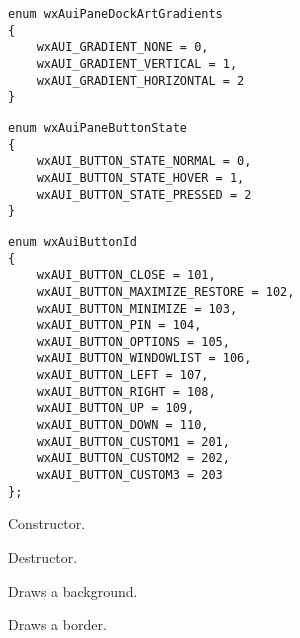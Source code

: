\begin{verbatim}
enum wxAuiPaneDockArtGradients
{
    wxAUI_GRADIENT_NONE = 0,
    wxAUI_GRADIENT_VERTICAL = 1,
    wxAUI_GRADIENT_HORIZONTAL = 2
}
\end{verbatim}

\begin{verbatim}
enum wxAuiPaneButtonState
{
    wxAUI_BUTTON_STATE_NORMAL = 0,
    wxAUI_BUTTON_STATE_HOVER = 1,
    wxAUI_BUTTON_STATE_PRESSED = 2
}
\end{verbatim}

\begin{verbatim}
enum wxAuiButtonId
{
    wxAUI_BUTTON_CLOSE = 101,
    wxAUI_BUTTON_MAXIMIZE_RESTORE = 102,
    wxAUI_BUTTON_MINIMIZE = 103,
    wxAUI_BUTTON_PIN = 104,
    wxAUI_BUTTON_OPTIONS = 105,
    wxAUI_BUTTON_WINDOWLIST = 106,
    wxAUI_BUTTON_LEFT = 107,
    wxAUI_BUTTON_RIGHT = 108,
    wxAUI_BUTTON_UP = 109,
    wxAUI_BUTTON_DOWN = 110,
    wxAUI_BUTTON_CUSTOM1 = 201,
    wxAUI_BUTTON_CUSTOM2 = 202,
    wxAUI_BUTTON_CUSTOM3 = 203
};
\end{verbatim}



\label{wxauidockartwxauidockart}


Constructor.

\label{wxauidockartdtor}


Destructor.

\label{wxauidockartdrawbackground}


Draws a background.

\label{wxauidockartdrawborder}


Draws a border.

\label{wxauidockartdrawcaption}


